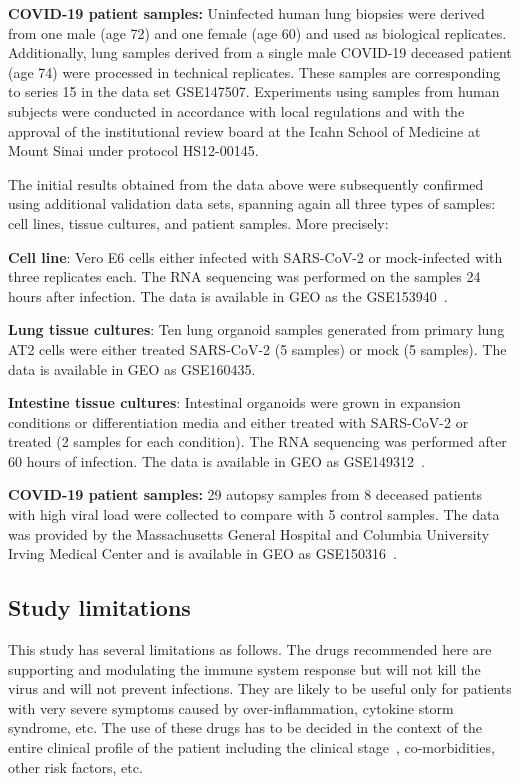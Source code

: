 \documentclass[Minh_PhD_thesis.tex]{subfiles}
\begin{document}
\textbf{COVID-19 patient samples:} Uninfected human lung biopsies were derived from one male (age 72) and one female (age 60) and used as biological replicates. Additionally, lung samples derived from a single male COVID-19 deceased patient (age 74) were processed in technical replicates. These samples are corresponding to series 15 in the data set GSE147507. Experiments using samples from human subjects were conducted in accordance with local regulations and with the approval of the institutional review board at the Icahn School of Medicine at Mount Sinai under protocol HS12-00145.

The initial results obtained from the data above were subsequently confirmed using additional validation data sets, spanning again all  three types of samples: cell lines, tissue cultures, and patient samples. More precisely:  

\textbf{Cell line}: Vero E6 cells either infected with SARS-CoV-2 or mock-infected with three replicates each. The RNA sequencing was performed on the samples 24 hours after infection. The data is available in GEO as the GSE153940~\cite{Riva:2020}.

\textbf{Lung tissue cultures}: Ten lung organoid samples generated from primary lung AT2 cells were either treated SARS-CoV-2 (5 samples) or mock (5 samples). The data is available in GEO as  GSE160435.

\textbf{Intestine tissue cultures}: Intestinal organoids were grown in expansion conditions or differentiation media and either treated with SARS-CoV-2 or treated (2 samples for each condition). The RNA sequencing was performed after 60 hours of infection. The data is available in GEO as GSE149312~\cite{Lamers:2020}.

\textbf{COVID-19 patient samples:} 29 autopsy samples from 8 deceased patients with high viral load were collected to compare with 5 control samples. The data was provided by the Massachusetts General Hospital and Columbia University Irving Medical Center and is available in GEO as GSE150316~\cite{desai2020temporal}.



\subsection{Study limitations}
This study has several limitations as follows. The drugs recommended here are supporting and modulating the immune system response but will not kill the virus and will not prevent infections. They are likely to be useful only for patients with very severe symptoms caused by over-inflammation,  cytokine storm syndrome, etc.  
The use of these drugs has to be decided in the context of the entire clinical profile of the patient including the clinical stage~\cite{siddiqi2020covid}, co-morbidities, other risk factors, etc.
\end{document}
